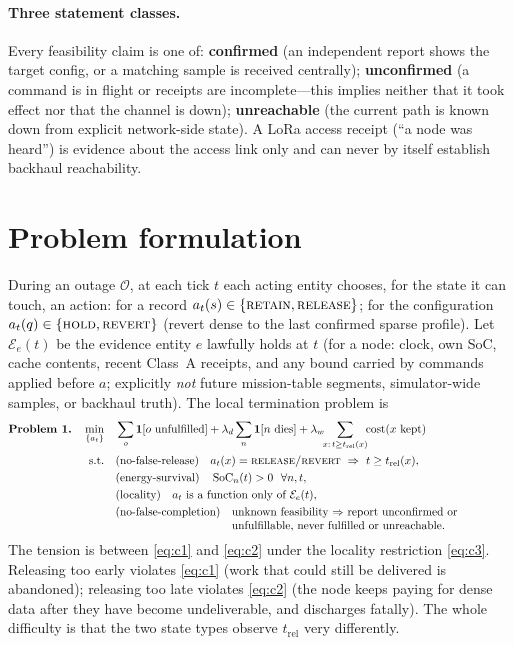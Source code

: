 \documentclass[11pt]{article}
\newcommand{\trel}{t_{\mathrm{rel}}}
\begin{document}
\paragraph{Three statement classes.}
Every feasibility claim is one of: \textbf{confirmed} (an independent report shows the target
config, or a matching sample is received centrally); \textbf{unconfirmed} (a command is in flight
or receipts are incomplete---this implies neither that it took effect nor that the channel is
down); \textbf{unreachable} (the current path is known down from explicit network-side state). A
LoRa access receipt (``a node was heard'') is evidence about the access link only and can never by
itself establish backhaul reachability.

\section{Problem formulation}
\label{sec:problem}

During an outage $\mathcal O$, at each tick $t$ each acting entity chooses, for the state it can
touch, an action: for a record $a_t(s)\in\{\textsc{retain},\textsc{release}\}$; for the
configuration $a_t(q)\in\{\textsc{hold},\textsc{revert}\}$ (revert dense to the last confirmed
sparse profile). Let $\mathcal E_e(t)$ be the evidence entity $e$ lawfully holds at $t$ (for a node:
clock, own SoC, cache contents, recent Class~A receipts, and any bound carried by commands applied
before $a$; explicitly \emph{not} future mission-table segments, simulator-wide samples, or
backhaul truth). The local termination problem is
\begin{align}
\textbf{Problem 1.}\quad
\min_{\{a_t\}}\quad
 & \sum_o \mathbf 1[o\ \text{unfulfilled}]
   +\lambda_d\sum_n \mathbf 1[n\ \text{dies}]
   +\lambda_w\!\!\sum_{x:\,t\geq\trel(x)}\!\! \operatorname{cost}(x\ \text{kept}) \label{eq:obj}\\
\text{s.t.}\quad
 & \text{(no-false-release)}\quad a_t(x)=\textsc{release/revert}\ \Rightarrow\
    t\geq\trel(x), \label{eq:c1}\\
 & \text{(energy-survival)}\quad \operatorname{SoC}_n(t)>0\ \ \forall n,t, \label{eq:c2}\\
 & \text{(locality)}\quad a_t\ \text{is a function only of}\ \mathcal E_e(t), \label{eq:c3}\\
 & \text{(no-false-completion)}\quad
    \parbox[t]{8.6cm}{\raggedright unknown feasibility $\Rightarrow$ report unconfirmed or unfulfillable, never fulfilled or unreachable.}\label{eq:c4}
\end{align}
The tension is between \eqref{eq:c1} and \eqref{eq:c2} under the locality restriction
\eqref{eq:c3}. Releasing too early violates \eqref{eq:c1} (work that could still be delivered is
abandoned); releasing too late violates \eqref{eq:c2} (the node keeps paying for dense data after
they have become undeliverable, and discharges fatally). The whole difficulty is that the two
state types observe $\trel$ very differently.
\end{document}
